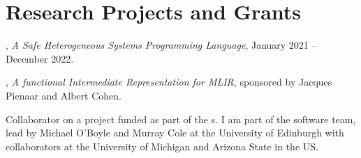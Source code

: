 \section{Research Projects and Grants}
\begin{cvitemize}
    \item {}, \textit{A Safe Heterogeneous Systems Programming Language}, January 2021 -- December 2022.%
    \item {}, \textit{A functional Intermediate Representation for MLIR}, sponsored by Jacques Pienaar and Albert Cohen.%
    \item Collaborator on a project funded as part of the s. I am part of the software team, lead by Michael O'Boyle and Murray Cole at the University of Edinburgh with collaborators at the University of Michigan and Arizona State in the US.
\end{cvitemize}